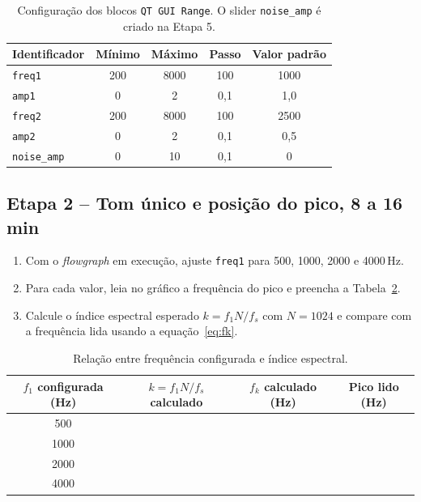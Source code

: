 \documentclass[11pt,a4paper]{article}
\begin{document}
\begin{table}[H]
  \centering
  \begin{tabular}{l c c c c}
    \toprule
    \textbf{Identificador} & \textbf{Mínimo} & \textbf{Máximo} &
      \textbf{Passo} & \textbf{Valor padrão} \\
    \midrule
    \texttt{freq1}      & 200 & 8000 & 100  & 1000 \\
    \texttt{amp1}       & 0   & 2    & 0{,}1 & 1{,}0 \\
    \texttt{freq2}      & 200 & 8000 & 100  & 2500 \\
    \texttt{amp2}       & 0   & 2    & 0{,}1 & 0{,}5 \\
    \texttt{noise\_amp} & 0   & 10   & 0{,}1 & 0 \\
    \bottomrule
  \end{tabular}
  \caption{Configuração dos blocos \texttt{QT GUI Range}. O slider
    \texttt{noise\_amp} é criado na Etapa 5.}
  \label{tab:sliders}
\end{table}

\subsection*{Etapa 2 -- Tom único e posição do pico, 8 a 16 min}

\begin{instrucao}
\begin{enumerate}[label=\arabic*.]
  \item Com o \textit{flowgraph} em execução, ajuste \texttt{freq1} para
    500, 1000, 2000 e 4000\,Hz.
  \item Para cada valor, leia no gráfico a frequência do pico e preencha a
    Tabela~\ref{tab:bins}.
  \item Calcule o índice espectral esperado $k = f_1 N / f_s$ com $N = 1024$
    e compare com a frequência lida usando a equação~\eqref{eq:fk}.
\end{enumerate}
\end{instrucao}

\begin{table}[H]
  \centering
  \begin{tabular}{c c c c}
    \toprule
    \textbf{$f_1$ configurada (Hz)} & \textbf{$k = f_1 N/f_s$ calculado} &
      \textbf{$f_k$ calculado (Hz)} & \textbf{Pico lido (Hz)} \\
    \midrule
    500  &  &  &  \\
    1000 &  &  &  \\
    2000 &  &  &  \\
    4000 &  &  &  \\
    \bottomrule
  \end{tabular}
  \caption{Relação entre frequência configurada e índice espectral.}
  \label{tab:bins}
\end{table}
\end{document}

